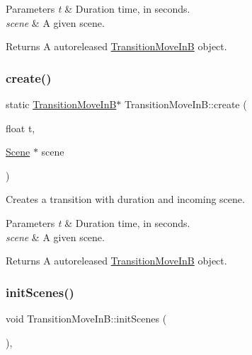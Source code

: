 \begin{DoxyParams}{Parameters}
{\em t} & Duration time, in seconds. \\
\hline
{\em scene} & A given scene. \\
\hline
\end{DoxyParams}
\begin{DoxyReturn}{Returns}
A autoreleased \hyperlink{classTransitionMoveInB}{Transition\+Move\+InB} object. 
\end{DoxyReturn}
\mbox{\label{classTransitionMoveInB_a81feb7a2e4af1ea60bdc384c8dd49b9d}} 
\subsubsection{\texorpdfstring{create()}{create()}\hspace{0.1cm}{\footnotesize\ttfamily [2/2]}}
{\footnotesize\ttfamily static \hyperlink{classTransitionMoveInB}{Transition\+Move\+InB}$\ast$ Transition\+Move\+In\+B\+::create (\begin{DoxyParamCaption}\item[{float}]{t,  }\item[{\hyperlink{classScene}{Scene} $\ast$}]{scene }\end{DoxyParamCaption})\hspace{0.3cm}{\ttfamily [static]}}

Creates a transition with duration and incoming scene.


\begin{DoxyParams}{Parameters}
{\em t} & Duration time, in seconds. \\
\hline
{\em scene} & A given scene. \\
\hline
\end{DoxyParams}
\begin{DoxyReturn}{Returns}
A autoreleased \hyperlink{classTransitionMoveInB}{Transition\+Move\+InB} object. 
\end{DoxyReturn}
\mbox{\label{classTransitionMoveInB_a3e86144d89423882fd847ee5e7e9b4ac}} 
\subsubsection{\texorpdfstring{init\+Scenes()}{initScenes()}\hspace{0.1cm}{\footnotesize\ttfamily [1/2]}}
{\footnotesize\ttfamily void Transition\+Move\+In\+B\+::init\+Scenes (\begin{DoxyParamCaption}{ }\end{DoxyParamCaption})\hspace{0.3cm}{\ttfamily [protected]}, {\ttfamily [virtual]}}

